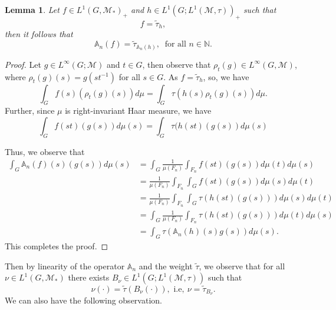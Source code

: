 \documentclass[11pt]{amsart}
\newtheorem{lem}[thm]{Lemma}
\theoremstyle{definition}
\theoremstyle{myremark}
\numberwithin{equation}{section}
\def\A{\mathbb A}
\def\N{\mathbb N}
\newcommand{\CM}{\mathcal{M}}
\newcommand{\CN}{\mathcal{N}}
\newcommand{\abs}[1]{\left\vert#1\right\vert}
\newcommand{\norm}[1]{\left\Vert#1\right\Vert}
\begin{document}
\begin{lem}\label{average-relation}
Let $ f \in L^1\left( G,  \CM_*\right)_+$ and 
$ h \in L^1( G; L^1(\CM, \tau) )_+ $ such that 
$$ f =\widetilde{ \tau}_h, $$ then it follows that 
$$ \A_n(f) = \widetilde{ \tau }_{ \A_n(h)}, ~ \text{ for all } n \in \N.$$
\end{lem}
\begin{proof}
Let $ g \in L^\infty(G; \CM)$  and   $ t \in G$, then observe that $ \rho_t(g) \in L^\infty(G, \CM) $, where $ \rho_t(g)(s) = g(st^{-1}) $ for all $ s \in G$. 
As $ f =\widetilde{ \tau}_h $, so, we have 
$$ \int_G f(s)(\rho_t(g)(s)) d\mu = \int_G \tau( h(s) \rho_t(g)(s) ) d\mu.$$
Further, since $\mu$ is right-invariant Haar measure, we have
$$ \int_G f(st)(g(s)) d\mu(s) = \int_G \tau( h(st) (g(s) ) d\mu(s)$$


Thus, we observe that 
\begin{align*}
    \int_G \A_n(f)(s) ( g(s) )  d\mu(s) 
    &=  \int_G  \frac{1}{\mu(F_n)}\int_{ F_n} f(st) ( g(s) )  d\mu(t) d\mu(s)\\
    &= \frac{1}{\mu(F_n)}\int_{ F_n}  \int_G  f(st) ( g(s) )   d\mu(s)   d\mu(t)\\
&= \frac{1}{\mu(F_n)}\int_{ F_n}  \int_G  \tau(h(st) ( g(s) )  )  d\mu(s)   d\mu(t)\\
&=  \int_G  \frac{1}{\mu(F_n)}\int_{ F_n}  \tau(h(st) ( g(s) )  )  d\mu(t)  d\mu(s)  \\
 &=  \int_G \tau(    \A_n(h)(s) g(s) ) d\mu(s).   \end{align*}
This completes the proof. 


\end{proof}

\noindent Then by linearity of the operator $\A_n$ and the weight $\tilde{\tau}$, we observe that for all $\nu \in L^1\left( G,  \CM_*\right)$ there exists $ B_\nu \in L^1\left(G; L^1(\CM,\tau) \right)$ such that 
$$ \nu( \cdot) = \widetilde{\tau}( B_\nu (\cdot) ), \text{ i.e}, ~\nu = \widetilde{ \tau}_{ B_\nu }. $$ We can also have the following observation.






\end{document}
